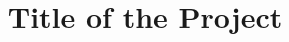 \documentclass{rmutt-project}
\title{Title of the Project}
\begin{document}
\makecover



\printtocs
\contentspages




\printref

\end{document}
